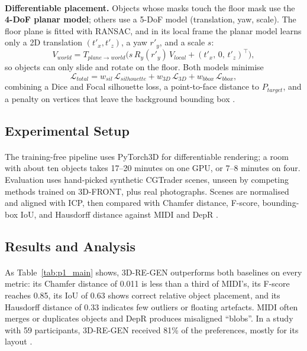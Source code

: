 \documentclass[12pt,a4paper,final]{extreport}
\begin{document}
\paragraph{} \textbf{Differentiable placement.} Objects whose masks touch the floor mask use the \textbf{4-DoF planar model}; others use a 5-DoF model (translation, yaw, scale). The floor plane is fitted with RANSAC, and in its local frame the planar model learns only a 2D translation $(t'_x,t'_z)$, a yaw $r'_y$, and a scale $s$:
\begin{equation}
V_{world}=T_{plane\rightarrow world}\big(s\,R_y(r'_y)\,V_{local}+(t'_x,\,0,\,t'_z)^{\top}\big),
\end{equation}
so objects can only slide and rotate on the floor. Both models minimise
\begin{equation}
\mathcal{L}_{total}=w_{sil}\,\mathcal{L}_{silhouette}+w_{3D}\,\mathcal{L}_{3D}+w_{bbox}\,\mathcal{L}_{bbox},
\end{equation}
combining a Dice and Focal silhouette loss, a point-to-face distance to $P_{target}$, and a penalty on vertices that leave the background bounding box \cite{p1}.

\subsection{Experimental Setup}

\paragraph{} The training-free pipeline uses PyTorch3D for differentiable rendering; a room with about ten objects takes 17--20 minutes on one GPU, or 7--8 minutes on four. Evaluation uses hand-picked synthetic CGTrader scenes, unseen by competing methods trained on 3D-FRONT, plus real photographs. Scenes are normalised and aligned with ICP, then compared with Chamfer distance, F-score, bounding-box IoU, and Hausdorff distance against MIDI and DepR \cite{p1}.

\subsection{Results and Analysis}

\paragraph{} As Table~\ref{tab:p1_main} shows, 3D-RE-GEN outperforms both baselines on every metric: its Chamfer distance of 0.011 is less than a third of MIDI's, its F-score reaches 0.85, its IoU of 0.63 shows correct relative object placement, and its Hausdorff distance of 0.33 indicates few outliers or floating artefacts. MIDI often merges or duplicates objects and DepR produces misaligned ``blobs''. In a study with 59 participants, 3D-RE-GEN received 81\% of the preferences, mostly for its layout \cite{p1}.
\end{document}
